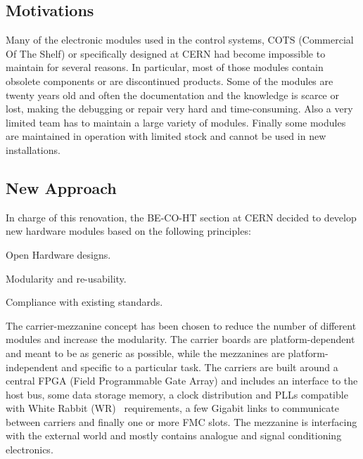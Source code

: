 \documentclass{JAC2003}
\begin{document}
\subsection{Motivations}
Many of the electronic modules used in the control systems, COTS (Commercial Of The Shelf) or specifically designed at CERN had become impossible to maintain for several reasons.
In particular, most of those modules contain obsolete components or are discontinued products.
Some of the modules are twenty years old and often the documentation and the knowledge is scarce or lost, making the debugging or repair very hard and time-consuming.
Also a very limited team has to maintain a large variety of modules.
Finally some modules are maintained in operation with limited stock and cannot be used in new installations.

\subsection{New Approach}
In charge of this renovation, the BE-CO-HT section at CERN decided to develop new hardware modules based on the following principles:
\begin{Itemize}
\item Open Hardware designs.
\item Modularity and re-usability.
\item Compliance with existing standards.
\end{Itemize}

The carrier-mezzanine concept has been chosen to reduce the number of different modules and increase the modularity.
The carrier boards are platform-dependent and meant to be as generic as possible, while the mezzanines are platform-independent and specific to a particular task.
The carriers are built around a central FPGA (Field Programmable Gate Array) and includes an interface to the host bus, some data storage memory, a clock distribution and PLLs compatible with White Rabbit (WR)~\cite{wr} requirements, a few Gigabit links to communicate between carriers and finally one or more FMC slots.
The mezzanine is interfacing with the external world and mostly contains analogue and signal conditioning electronics.
\end{document}
